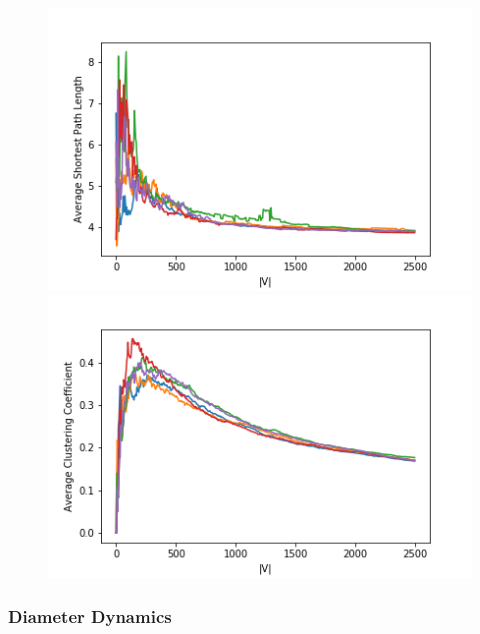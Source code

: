 \documentclass[12pt,twoside]{report}
\begin{document}
\begin{figure}[H]
\begin{center}
\begin{minipage}{0.45\linewidth}
\includegraphics[width=\linewidth]{figures/lens.png}
\end{minipage}%
\hfill
\begin{minipage}{0.45\linewidth}
\includegraphics[width=\linewidth]{figures/clusts.png}
\end{minipage}
\end{center}
\end{figure}

\subsubsection{Diameter Dynamics}
\end{document}
